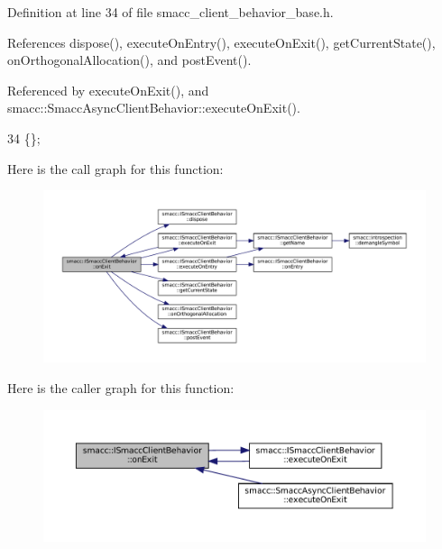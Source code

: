 Definition at line 34 of file smacc\+\_\+client\+\_\+behavior\+\_\+base.\+h.



References dispose(), execute\+On\+Entry(), execute\+On\+Exit(), get\+Current\+State(), on\+Orthogonal\+Allocation(), and post\+Event().



Referenced by execute\+On\+Exit(), and smacc\+::\+Smacc\+Async\+Client\+Behavior\+::execute\+On\+Exit().


\begin{DoxyCode}
34 \{\};
\end{DoxyCode}
Here is the call graph for this function\+:
\nopagebreak
\begin{figure}[H]
\begin{center}
\leavevmode
\includegraphics[width=350pt]{classsmacc_1_1ISmaccClientBehavior_a36bf771905e3bf750909a15e4215a9b3_cgraph}
\end{center}
\end{figure}
Here is the caller graph for this function\+:
\nopagebreak
\begin{figure}[H]
\begin{center}
\leavevmode
\includegraphics[width=350pt]{classsmacc_1_1ISmaccClientBehavior_a36bf771905e3bf750909a15e4215a9b3_icgraph}
\end{center}
\end{figure}
\mbox{\label{classsmacc_1_1ISmaccClientBehavior_a6765b53cec4eb8c663cc8c2d63649ae4}} 
